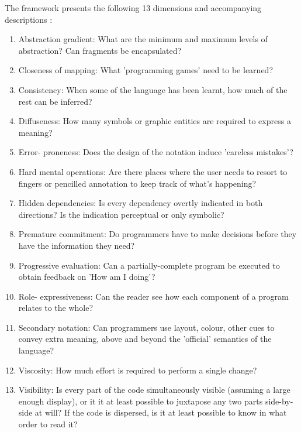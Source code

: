 The framework presents the following 13 dimensions and accompanying descriptions \citep{green_usability_1996}:
\begin{enumerate}
  \item Abstraction gradient: What are the minimum and maximum levels of abstraction? Can fragments be encapsulated? 

  \item Closeness of mapping: What 'programming games' need to be learned? 
  
  \item Consistency: When some of the language has been learnt, how much of the rest can be inferred? 
  
  \item Diffuseness: How many symbols or graphic entities are required to express a meaning? 
  
  \item Error- proneness: Does the design of the notation induce 'careless mistakes'? 
  
  \item Hard mental operations: Are there places where the user needs to resort to fingers or pencilled annotation to keep track of what's happening? 
  
  \item Hidden dependencies: Is every dependency overtly indicated in both directions? Is the indication perceptual or only symbolic? 
  
  \item Premature commitment: Do programmers have to make decisions before they have the information they need? 
  
  \item Progressive evaluation: Can a partially-complete program be executed to obtain feedback on 'How am I doing'? 
  
  \item Role- expressiveness: Can the reader see how each component of a program relates to the whole? 
  
  \item Secondary notation: Can programmers use layout, colour, other cues to convey extra meaning, above and beyond the 'official' semantics of the language? 
  
  \item Viscosity: How much effort is required to perform a single change? 
  
  \item Visibility: Is every part of the code simultaneously visible (assuming a large enough display), or it it at least possible to juxtapose any two parts side-by-side at will? If the code is dispersed, is it at least possible to know in what order to read it?
\end{enumerate}

